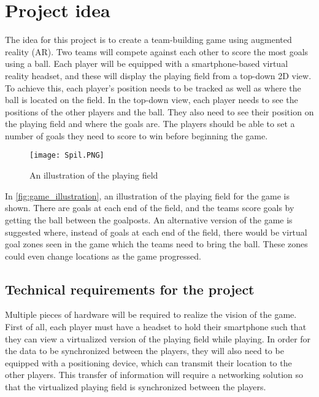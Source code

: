 \section{Project idea}\label{sec:projectidea}
The idea for this project is to create a team-building game using augmented reality (AR).
Two teams will compete against each other to score the most goals using a ball. 
Each player will be equipped with a smartphone-based virtual reality headset, and these will display the playing field from a top-down 2D view. 
To achieve this, each player's position needs to be tracked as well as where the ball is located on the field.
In the top-down view, each player needs to see the positions of the other players and the ball.
They also need to see their position on the playing field and where the goals are.
The players should be able to set a number of goals they need to score to win before beginning the game. 
\begin{figure}[H]
    \centering
    \texttt{[image: Spil.PNG]}
    \caption{An illustration of the playing field}
    \label{fig:game_illustration}
\end{figure}
\noindent
In \autoref{fig:game_illustration}, an illustration of the playing field for the game is shown.
There are goals at each end of the field, and the teams score goals by getting the ball between the goalposts.
An alternative version of the game is suggested where, instead of goals at each end of the field, there would be virtual goal zones seen in the game which the teams need to bring the ball.
These zones could even change locations as the game progressed.

\subsection{Technical requirements for the project}
Multiple pieces of hardware will be required to realize the vision of the game.
First of all, each player must have a headset to hold their smartphone such that they can view a virtualized version of the playing field while playing.
In order for the data to be synchronized between the players, they will also need to be equipped with a positioning device, which can transmit their location to the other players.
This transfer of information will require a networking solution so that the virtualized playing field is synchronized between the players.

